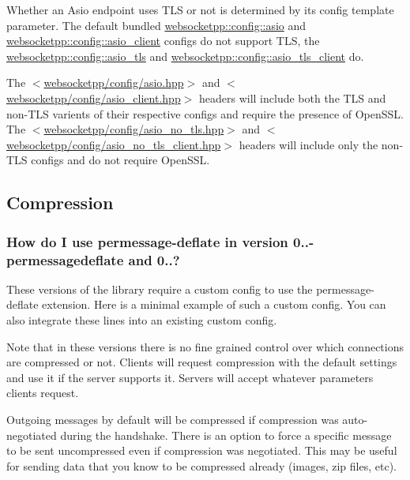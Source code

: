 Whether an Asio endpoint uses T\+LS or not is determined by its config template parameter. The default bundled {\ttfamily \mbox{\hyperlink{structwebsocketpp_1_1config_1_1asio}{websocketpp\+::config\+::asio}}} and {\ttfamily \mbox{\hyperlink{structwebsocketpp_1_1config_1_1asio__client}{websocketpp\+::config\+::asio\+\_\+client}}} configs do not support T\+LS, the {\ttfamily \mbox{\hyperlink{structwebsocketpp_1_1config_1_1asio__tls}{websocketpp\+::config\+::asio\+\_\+tls}}} and {\ttfamily \mbox{\hyperlink{structwebsocketpp_1_1config_1_1asio__tls__client}{websocketpp\+::config\+::asio\+\_\+tls\+\_\+client}}} do.

The {\ttfamily $<$\mbox{\hyperlink{config_2asio_8hpp_source}{websocketpp/config/asio.\+hpp}}$>$} and {\ttfamily $<$\mbox{\hyperlink{asio__client_8hpp_source}{websocketpp/config/asio\+\_\+client.\+hpp}}$>$} headers will include both the T\+LS and non-\/\+T\+LS varients of their respective configs and require the presence of Open\+S\+SL. The {\ttfamily $<$\mbox{\hyperlink{asio__no__tls_8hpp_source}{websocketpp/config/asio\+\_\+no\+\_\+tls.\+hpp}}$>$} and {\ttfamily $<$\mbox{\hyperlink{asio__no__tls__client_8hpp_source}{websocketpp/config/asio\+\_\+no\+\_\+tls\+\_\+client.\+hpp}}$>$} headers will include only the non-\/\+T\+LS configs and do not require Open\+S\+SL.

\subsection*{Compression}

\subsubsection*{How do I use permessage-\/deflate in version 0..-\/permessagedeflate and 0..?}

These versions of the library require a custom config to use the permessage-\/deflate extension. Here is a minimal example of such a custom config. You can also integrate these lines into an existing custom config.

Note that in these versions there is no fine grained control over which connections are compressed or not. Clients will request compression with the default settings and use it if the server supports it. Servers will accept whatever parameters clients request.

Outgoing messages by default will be compressed if compression was auto-\/negotiated during the handshake. There is an option to force a specific message to be sent uncompressed even if compression was negotiated. This may be useful for sending data that you know to be compressed already (images, zip files, etc).

